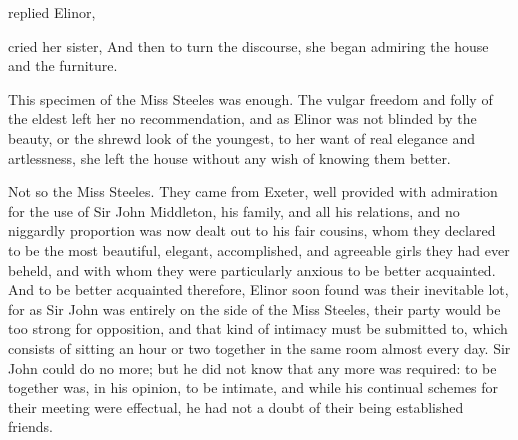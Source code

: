 
 replied Elinor, 


 cried her sister,  And then to turn the discourse, she began admiring the house and the furniture.

This specimen of the Miss Steeles was enough. The vulgar freedom and folly of the eldest left her no recommendation, and as Elinor was not blinded by the beauty, or the shrewd look of the youngest, to her want of real elegance and artlessness, she left the house without any wish of knowing them better.

Not so the Miss Steeles. They came from Exeter, well provided with admiration for the use of Sir John Middleton, his family, and all his relations, and no niggardly proportion was now dealt out to his fair cousins, whom they declared to be the most beautiful, elegant, accomplished, and agreeable girls they had ever beheld, and with whom they were particularly anxious to be better acquainted. And to be better acquainted therefore, Elinor soon found was their inevitable lot, for as Sir John was entirely on the side of the Miss Steeles, their party would be too strong for opposition, and that kind of intimacy must be submitted to, which consists of sitting an hour or two together in the same room almost every day. Sir John could do no more; but he did not know that any more was required: to be together was, in his opinion, to be intimate, and while his continual schemes for their meeting were effectual, he had not a doubt of their being established friends.

